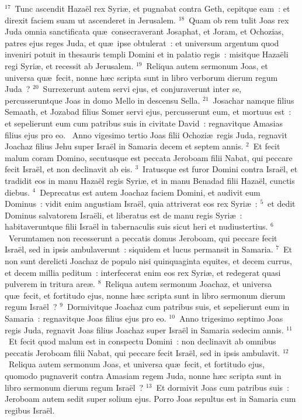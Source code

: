 ${}^{17}$~Tunc ascendit Haza\"el rex Syri\ae , et pugnabat contra Geth, cepitque eam~: et direxit faciem suam ut ascenderet in Jerusalem.
${}^{18}$~Quam ob rem tulit Joas rex Juda omnia sanctificata qu\ae\ consecraverant Josaphat, et Joram, et Ochozias, patres ejus reges Juda, et qu\ae\ ipse obtulerat~: et universum argentum quod inveniri potuit in thesauris templi Domini et in palatio regis~: misitque Haza\"eli regi Syri\ae , et recessit ab Jerusalem.
${}^{19}$~Reliqua autem sermonum Joas, et universa qu\ae\ fecit, nonne h\ae c scripta sunt in libro verborum dierum regum Juda~?
${}^{20}$~Surrexerunt autem servi ejus, et conjuraverunt inter se, percusseruntque Joas in domo Mello in descensu Sella.
${}^{21}$~Josachar namque filius Semaath, et Jozabad filius Somer servi ejus, percusserunt eum, et mortuus est~: et sepelierunt eum cum patribus suis in civitate David~: regnavitque Amasias filius ejus pro eo.
~Anno vigesimo tertio Joas filii Ochozi\ae\ regis Juda, regnavit Joachaz filius Jehu super Isra\"el in Samaria decem et septem annis.
${}^{2}$~Et fecit malum coram Domino, secutusque est peccata Jeroboam filii Nabat, qui peccare fecit Isra\"el, et non declinavit ab eis.
${}^{3}$~Iratusque est furor Domini contra Isra\"el, et tradidit eos in manu Haza\"el regis Syri\ae , et in manu Benadad filii Haza\"el, cunctis diebus.
${}^{4}$~Deprecatus est autem Joachaz faciem Domini, et audivit eum Dominus~: vidit enim angustiam Isra\"el, quia attriverat eos rex Syri\ae~:
${}^{5}$~et dedit Dominus salvatorem Isra\"eli, et liberatus est de manu regis Syri\ae~: habitaveruntque filii Isra\"el in tabernaculis suis sicut heri et nudiustertius.
${}^{6}$~Verumtamen non recesserunt a peccatis domus Jeroboam, qui peccare fecit Isra\"el, sed in ipsis ambulaverunt~: siquidem et lucus permansit in Samaria.
${}^{7}$~Et non sunt derelicti Joachaz de populo nisi quinquaginta equites, et decem currus, et decem millia peditum~: interfecerat enim eos rex Syri\ae , et redegerat quasi pulverem in tritura are\ae .
${}^{8}$~Reliqua autem sermonum Joachaz, et universa qu\ae\ fecit, et fortitudo ejus, nonne h\ae c scripta sunt in libro sermonum dierum regum Isra\"el~?
${}^{9}$~Dormivitque Joachaz cum patribus suis, et sepelierunt eum in Samaria~: regnavitque Joas filius ejus pro eo.
${}^{10}$~Anno trigesimo septimo Joas regis Juda, regnavit Joas filius Joachaz super Isra\"el in Samaria sedecim annis.
${}^{11}$~Et fecit quod malum est in conspectu Domini~: non declinavit ab omnibus peccatis Jeroboam filii Nabat, qui peccare fecit Isra\"el, sed in ipsis ambulavit.
${}^{12}$~Reliqua autem sermonum Joas, et universa qu\ae\ fecit, et fortitudo ejus, quomodo pugnaverit contra Amasiam regem Juda, nonne h\ae c scripta sunt in libro sermonum dierum regum Isra\"el~?
${}^{13}$~Et dormivit Joas cum patribus suis~: Jeroboam autem sedit super solium ejus. Porro Joas sepultus est in Samaria cum regibus Isra\"el.


